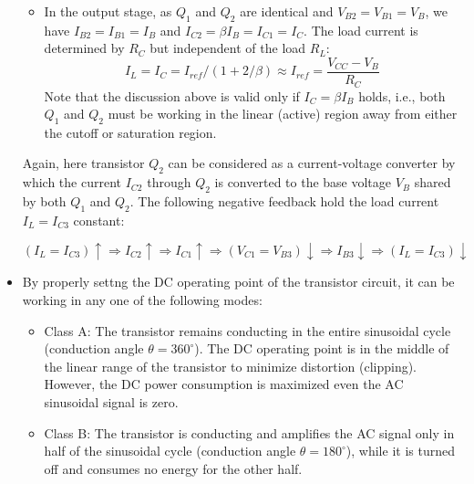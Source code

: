 \documentclass{article}
\begin{document}
\begin{itemize}
\begin{itemize}
  \item In the output stage, as $Q_1$ and $Q_2$ are identical and 
    $V_{B2}=V_{B1}=V_B$, we have $I_{B2}=I_{B1}=I_B$ and $I_{C2}=\beta I_B=I_{C1}=I_C$. 
    The load current is determined by $R_C$ but independent of the load $R_L$:
    \begin{equation}
      I_L=I_C=I_{ref}/(1+2/\beta) \approx I_{ref}
      =\frac{V_{CC}-V_B}{R_C}
    \end{equation}
    Note that the discussion above is valid only if $I_C=\beta I_B$ holds,
    i.e., both $Q_1$ and $Q_2$ must be working in the linear (active) region 
    away from either the cutoff or saturation region.
  \end{itemize}


  

  Again, here transistor $Q_2$ can be considered as a current-voltage
  converter by which the current $I_{C2}$ through $Q_2$ is converted to 
  the base voltage $V_B$ shared by both $Q_1$ and $Q_2$. The following
  negative feedback hold the load current $I_L=I_{C3}$ constant:  
  
  \begin{equation}
  (I_L=I_{C3})\uparrow \Longrightarrow I_{C2}\uparrow \Longrightarrow 
  I_{C1}\uparrow\Longrightarrow (V_{C1}=V_{B3})\downarrow \Longrightarrow 
  I_{B3}\downarrow \Longrightarrow (I_L=I_{C3})\downarrow
  \end{equation}

\item {} 

By properly settng the DC operating point of the transistor circuit, 
it can be working in any one of the following modes:
\begin{itemize}
\item Class A: The transistor remains conducting in the entire sinusoidal
  cycle (conduction angle $\theta=360^\circ$). The DC operating point is 
  in the middle of the linear range of the transistor to minimize distortion
  (clipping). However, the DC power consumption is maximized even the AC 
  sinusoidal signal is zero. 
  
\item Class B: The transistor is conducting and amplifies the AC signal
  only in half of the sinusoidal cycle (conduction angle $\theta=180^\circ$), 
  while it is turned off and consumes no energy for the other half.


\end{itemize}
\end{itemize}
\end{document}
